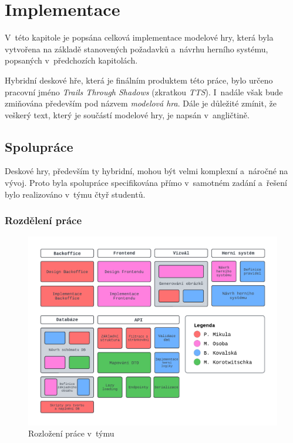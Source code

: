 \chapter{Implementace}
\label{chap:development}

V~této kapitole je popsána celková implementace modelové hry, která byla vytvořena na základě stanovených požadavků a~návrhu herního systému, popsaných v~předchozích kapitolách.

Hybridní deskové hře, která je finálním produktem této práce, bylo určeno pracovní jméno \textit{Trails Through Shadows} (zkratkou \textit{TTS}). I~nadále však bude zmiňována především pod názvem \textit{modelová hra}. Dále je důležité zmínit, že veškerý text, který je součástí modelové hry, je napsán v~angličtině.

\section{Spolupráce}
\label{sec:collaboration}

Deskové hry, především ty hybridní, mohou být velmi komplexní a~náročné na vývoj. Proto byla spolupráce specifikována přímo v~samotném zadání a~řešení bylo realizováno v~týmu čtyř studentů.

\subsection{Rozdělení práce}
\label{subsec:job_distribution}

\begin{figure}[h]
    \centering
    \includegraphics[width=\textwidth]{../../shared/diagrams/blocks.pdf}
    \caption{Rozložení práce v~týmu}
    \label{fig:job_distribution}
\end{figure}

